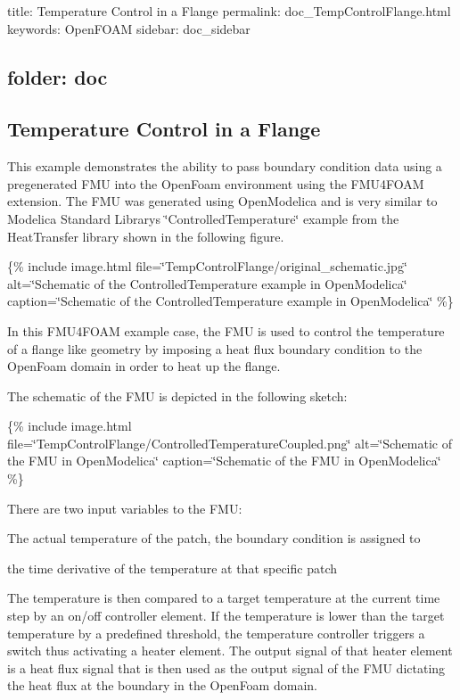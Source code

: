 

 title\+: Temperature Control in a Flange permalink\+: doc\+\_\+\+Temp\+Control\+Flange.\+html keywords\+: Open\+F\+O\+AM sidebar\+: doc\+\_\+sidebar \subsection*{folder\+: doc }

\subsection*{Temperature Control in a Flange}

This example demonstrates the ability to pass boundary condition data using a pregenerated F\+MU into the Open\+Foam environment using the F\+M\+U4\+F\+O\+AM extension. The F\+MU was generated using Open\+Modelica and is very similar to Modelica Standard Library\textquotesingle{}s \char`\"{}\+Controlled\+Temperature\char`\"{} example from the Heat\+Transfer library shown in the following figure.

\{\% include image.\+html file=\char`\"{}\+Temp\+Control\+Flange/original\+\_\+schematic.\+jpg\char`\"{} alt=\char`\"{}\+Schematic of the Controlled\+Temperature example in Open\+Modelica\char`\"{} caption=\char`\"{}\+Schematic of the Controlled\+Temperature example in Open\+Modelica\char`\"{} \%\}

In this F\+M\+U4\+F\+O\+AM example case, the F\+MU is used to control the temperature of a flange like geometry by imposing a heat flux boundary condition to the Open\+Foam domain in order to heat up the flange.

The schematic of the F\+MU is depicted in the following sketch\+:

\{\% include image.\+html file=\char`\"{}\+Temp\+Control\+Flange/\+Controlled\+Temperature\+Coupled.\+png\char`\"{} alt=\char`\"{}\+Schematic of the F\+M\+U in Open\+Modelica\char`\"{} caption=\char`\"{}\+Schematic of the F\+M\+U in Open\+Modelica\char`\"{} \%\}

There are two input variables to the F\+MU\+:


\begin{DoxyEnumerate}
\item The actual temperature of the patch, the boundary condition is assigned to
\item the time derivative of the temperature at that specific patch
\end{DoxyEnumerate}

The temperature is then compared to a target temperature at the current time step by an on/off controller element. If the temperature is lower than the target temperature by a predefined threshold, the temperature controller triggers a switch thus activating a heater element. The output signal of that heater element is a heat flux signal that is then used as the output signal of the F\+MU dictating the heat flux at the boundary in the Open\+Foam domain.

